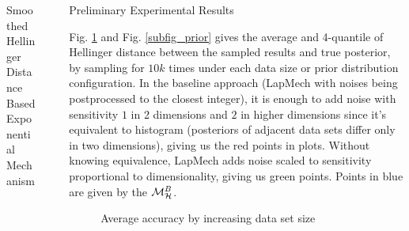 \documentclass[final,hyperref={pdfpagelabels=false}]{beamer}
\begin{document}
\begin{frame}[t]
\begin{columns}[t]
\begin{column}{.485\textwidth}
\begin{block}{Smoothed Hellinger Distance Based Exponential Mechanism}
\end{block}


\end{column} %

\begin{column}{.01\textwidth}\end{column} %
 
\begin{column}{.485\textwidth} %






\begin{block}{Preliminary Experimental Results}

  Fig. \ref{fig_sampling} and Fig. \ref{subfig_prior} gives the average and 4-quantile of Hellinger distance between the sampled results and true posterior, by sampling for $10k$ times under each data size or prior distribution configuration.
  In the baseline approach (LapMech {\small with noises being postprocessed to the closest integer}), it is enough to add noise with sensitivity $1$ in 2 dimensions and $2$ in higher dimensions since it's equivalent to histogram
  (posteriors of adjacent data sets differ only in two dimensions),
  giving us the red points in plots. Without knowing equivalence, LapMech adds noise scaled to sensitivity proportional to dimensionality, giving us green points.
  Points in blue are given by the $\mathcal{M}^{B}_{\mathcal{H}}$.

\begin{figure}[H]
\begin{center}
\centering
  \caption{Average accuracy by increasing data set size}
\label{fig_sampling}
\end{center}
\end{figure}


\end{block}
\end{column}
\end{columns}
\end{frame}
\end{document}
